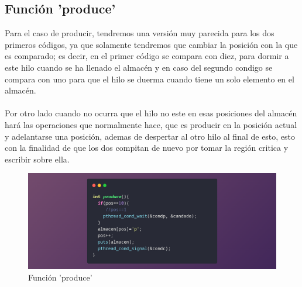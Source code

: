 \documentclass[10pt]{article}
\begin{document}
	\subsection{Función 'produce'}
	Para el caso de producir, tendremos una versión muy parecida para los dos primeros códigos, ya que solamente tendremos que cambiar la posición con la que es comparado; es decir, en el primer código se compara con diez, para dormir a este hilo cuando se ha llenado el almacén y en caso del segundo condigo se compara con uno para que el hilo se duerma cuando tiene un solo elemento en el almacén.
	\\\\
	Por otro lado cuando no ocurra que el hilo no este en esas posiciones del almacén  hará las operaciones que normalmente hace, que es producir en la posición actual y adelantarse una posición, ademas de despertar al otro hilo al final de esto, esto con la finalidad de que los dos compitan de nuevo por tomar la región critica y escribir sobre ella.  
	\begin{figure}[h!]
		\centering
		\includegraphics[width=\linewidth]{produce.png}
		\caption{Función 'produce'}
		\label{fig:produce}
	\end{figure}
\end{document}
